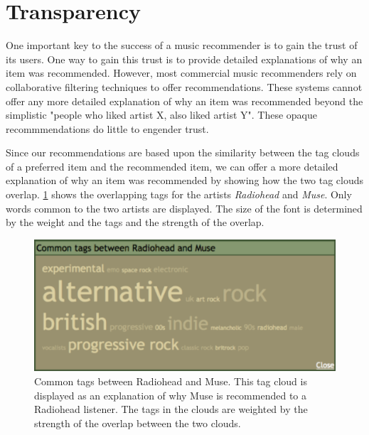 \documentclass[a4paper,9pt,twocolumn]{article}
\begin{document}
\section{Transparency}
One important key to the success  of a music recommender is to gain the
trust of its users\cite{trust}.  One way to gain this trust is to provide
detailed explanations of why an item was recommended.  However,
most commercial music recommenders rely on collaborative filtering
techniques to offer recommendations.  These systems cannot offer
any more detailed explanation of why an item was recommended beyond
the simplistic "people who liked artist X, also liked artist Y".
These opaque recommmendations do little to engender trust.

Since our recommendations are based upon the similarity between  the tag clouds
of a preferred item and the recommended item, we can
offer a more detailed explanation of why an item was recommended
by showing how the two tag clouds overlap. \ref{fig:commontags} shows
the overlapping tags for the artists \textit{Radiohead} and \textit{Muse}.
Only words common to the two artists are displayed. The size of the
font is determined by the weight and the tags and the strength of the
overlap.

\begin{figure}[ht]
\begin{center}
\includegraphics[width=0.9\columnwidth]{radiohead-muse-commontags}
\end{center}
\caption{Common tags between Radiohead and Muse. This tag cloud is displayed as an 
explanation of why Muse is recommended to a Radiohead listener. The tags in the 
clouds are weighted by the strength of the overlap between the two clouds.}
\label{fig:commontags}
\end{figure}

\label{section:steerable}
\end{document}
